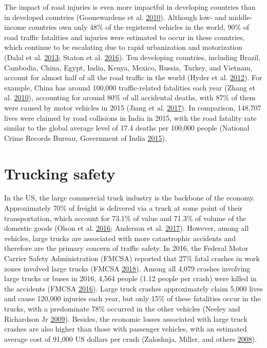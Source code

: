 \documentclass[12pt]{book}
\numberwithin{equation}{chapter}
\begin{document}
The impact of road injuries is even more impactful in developing countries than in developed countries (Goonewardene et al. \protect\hyperlink{ref-goonewardene2010road}{2010}).
Although low- and middle-income countries own only 48\% of the registered vehicles in the world, 90\% of road traffic fatalities and injuries were estimated to occur in these countries, which continue to be escalating due to rapid urbanization and motorization (Dalal et al. \protect\hyperlink{ref-dalal2013economics}{2013}; Staton et al. \protect\hyperlink{ref-staton2016road}{2016}).
Ten developing countries, including Brazil, Cambodia, China, Egypt, India, Kenya, Mexico, Russia, Turkey, and Vietnam, account for almost half of all the road traffic in the world (Hyder et al. \protect\hyperlink{ref-hyder2012addressing}{2012}).
For example, China has around 100,000 traffic-related fatalities each year (Zhang et al. \protect\hyperlink{ref-zhang2010road}{2010}), accounting for around 80\% of all accidental deaths, with 87\% of them were caused by motor vehicles in 2015 (Jiang et al. \protect\hyperlink{ref-jiang2017transport}{2017}).
In comparison, 148,707 lives were claimed by road collisions in India in 2015, with the road fatality rate similar to the global average level of 17.4 deaths per 100,000 people (National Crime Records Bureau, Government of India \protect\hyperlink{ref-india2015}{2015}).

\hypertarget{trucking-safety}{%
\section{Trucking safety}\label{trucking-safety}}

In the US, the large commercial truck industry is the backbone of the economy. Approximately 70\% of freight is delivered via a truck at some point of their transportation, which account for 73.1\% of value and 71.3\% of volume of the domestic goods (Olson et al. \protect\hyperlink{ref-olson2016weight}{2016}; Anderson et al. \protect\hyperlink{ref-anderson2017exploratory}{2017}).
However, among all vehicles, large trucks are associated with more catastrophic accidents and therefore are the primary concern of traffic safety. In 2016, the Federal Motor Carrier Safety Administration (FMCSA) reported that 27\% fatal crashes in work zones involved large trucks (FMCSA \protect\hyperlink{ref-fmcsareport2016}{2018}). Among all 4,079 crashes involving large trucks or buses in 2016, 4,564 people (1.12 people per crash) were killed in the accidents (FMCSA \protect\hyperlink{ref-fmcsafacts2016}{2016}). Large truck crashes approximately claim 5,000 lives and cause 120,000 injuries each year, but only 15\% of these fatalities occur in the trucks, with a predominate 78\% occurred in the other vehicles (Neeley and Richardson Jr \protect\hyperlink{ref-neeley2009effect}{2009}). Besides, the economic losses associated with large truck crashes are also higher than those with passenger vehicles, with an estimated average cost of 91,000 US dollars per crash (Zaloshnja, Miller, and others \protect\hyperlink{ref-zaloshnja2008unit}{2008}).
\end{document}
